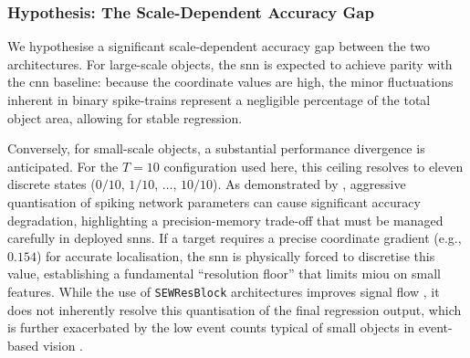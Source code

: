 \subsubsection{Hypothesis: The Scale-Dependent Accuracy Gap}
\label{subsubsec:quant_hyp}

We hypothesise a significant scale-dependent accuracy gap between the two architectures.
For large-scale objects, the \gls{snn} is expected to achieve parity with the \gls{cnn} baseline: because the coordinate values are high, the minor fluctuations inherent in binary spike-trains represent a negligible percentage of the total object area, allowing for stable regression.

Conversely, for small-scale objects, a substantial performance divergence is anticipated. 
For the $T=10$ configuration used here, this ceiling resolves to eleven discrete states ($0/10$, $1/10$, $\ldots$, $10/10$).
As demonstrated by \textcite{quantization_error_putra}, aggressive quantisation of spiking network parameters can cause significant accuracy degradation, highlighting a precision-memory trade-off that must be managed carefully in deployed \glspl{snn}. 
If a target requires a precise coordinate gradient (e.g., $0.154$) for accurate localisation, the \gls{snn} is physically forced to discretise this value, establishing a fundamental ``resolution floor'' that limits \gls{miou} on small features. 
While the use of \texttt{SEWResBlock} architectures improves signal flow \cite{fang2022resnet_sew}, it does not inherently resolve this quantisation of the final regression output, which is further exacerbated by the low event counts typical of small objects in event-based vision \cite{gallego2020event}.
